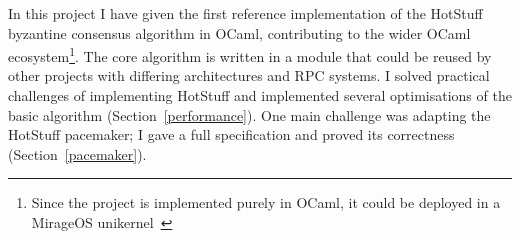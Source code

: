 




In this project I have given the first reference implementation of the HotStuff byzantine consensus algorithm in OCaml, contributing to the wider OCaml ecosystem\footnote{Since the project is implemented purely in OCaml, it could be deployed in a MirageOS unikernel~\cite{mirage}}. The core algorithm is written in a module that could be reused by other projects with differing architectures and RPC systems. I solved practical challenges of implementing HotStuff and implemented several optimisations of the basic algorithm (Section~\ref{performance}). One main challenge was adapting the HotStuff pacemaker; I gave a full specification and proved its correctness (Section~\ref{pacemaker}).

